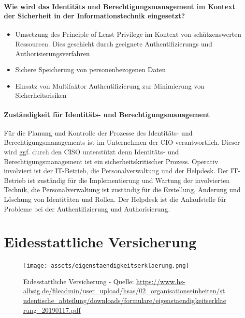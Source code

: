 \documentclass[11pt]{article}
\begin{document}
\paragraph{Wie wird das Identitäts und Berechtigungsmanagement im Kontext der Sicherheit in der Informationstechnik eingesetzt?}
\begin{itemize}
  \item Umsetzung des Principle of Least Privilege im Kontext von schützenswerten Ressourcen. Dies geschieht durch geeignete Authentifizierungs und Authorisierungsverfahren
  \item Sichere Speicherung von personenbezogenen Daten
  \item Einsatz von Multifaktor Authentifizierung zur Minimierung von Sicherheitsrisiken
\end{itemize}
\paragraph{Zuständigkeit für Identitäts- und Berechtigungsmanagement}
Für die Planung und Kontrolle der Prozesse des Identitäts- und Berechtigungsmanagements ist im Unternehmen der CIO verantwortlich. Dieser wird ggf. durch den CISO unterstützt denn Identitäts- und Berechtigungsmanagement ist ein sicherheitskritischer Prozess. Operativ involviert ist der IT-Betrieb, die Personalverwaltung und der Helpdesk. Der IT-Betrieb ist zuständig für die Implementierung und Wartung der involvierten Technik, die Personalverwaltung ist zuständig für die Erstellung, Änderung und Löschung von Identitäten und Rollen. Der Helpdesk ist die Anlaufstelle für Probleme bei der Authentifizierung und Authorisierung.
\newpage
\section{Eidesstattliche Versicherung}
\begin{figure}[H]
  \centering
  \texttt{[image: assets/eigenstaendigkeitserklaerung.png]}
  \caption{Eidesstattliche Versicherung - Quelle: \url{https://www.hs-albsig.de/fileadmin/user_upload/hsas/02_organisationseinheiten/studentische_abteilung/downloads/formulare/eigenstaendigkeitserklaerung_20190117.pdf}}\label{fig:eigenstaendigkeitserklaerung}
\end{figure}
\newpage
\printbibliography[notkeyword={quelle}, title={Literaturverzeichnis}]
\newpage
\printbibliography[keyword={quelle}, title={Quellenverzeichnis}]
\newpage
\listoffigures
\end{document}
